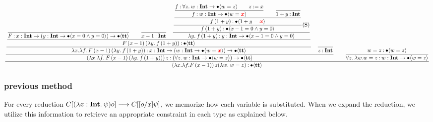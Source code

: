 \documentclass{article}
\begin{document}
\small
\begin{equation*}
    \dfrac{
    \dfrac{
        \dfrac{
            \dfrac{
                    \dfrac{
                    }{
                    F \mathbin{:} {x} : \textbf{Int} \to ({y} : \textbf{Int} \to \bullet \langle x = 0 \wedge y = 0 \rangle) \to \bullet \langle \textbf{tt} \rangle
                    }
                    \qquad
                    \dfrac{}{
                    x - 1 \mathbin{:} \textbf{Int}
                    }
                \quad
                \dfrac{
                    \dfrac{
                        \dfrac{
                            \dfrac{f \mathbin{:} \forall z.\: {w} : \textbf{Int} \to \bullet \langle w = z \rangle\qquad z := x}{
                                f \mathbin{:} {w} : \textbf{Int} \to \bullet \langle w=\textcolor{red}{\boldsymbol x} \rangle
                            }
                            \qquad
                            \dfrac{}{
                                1+y \mathbin{:} \textbf{Int}
                            }
                        }{
                            f\,(1+y) \mathbin{:} \bullet \langle 1+y=\textcolor{red}{\boldsymbol x} \rangle
                        }
                    } {
                        f\,(1+y) \mathbin{:} \bullet \langle x - 1 = 0 \wedge y = 0 \rangle
                    }\text{(S)}
                } {
                    \lambda y.\: f\,(1+y) \mathbin{:} {y} : \textbf{Int} \to \bullet \langle x - 1 = 0 \wedge y = 0 \rangle
                }
            }{
                F\, (x-1)\, (\lambda y.\: f\,(1+y))  \mathbin{:} \bullet \langle \textbf{tt} \rangle
            }
        }{
            \lambda x. \lambda f.\: F\, (x-1)\, (\lambda y.\: f\,(1+y)) \mathbin{:} {x} : \textbf{Int} \to ({w} : \textbf{Int} \to \bullet \langle w = \textcolor{red}{\boldsymbol x} \rangle) \to \bullet \langle \textbf{tt} \rangle
        }
        \quad
        \dfrac{}{
        z \mathbin{:} \textbf{Int}
        }
        }{
            (\lambda x. \lambda f.\: F\, (x-1)\, (\lambda y.\: f\,(1+y)))\, z \mathbin{:} (\forall z.\: {w} : \textbf{Int} \to \bullet \langle w = z \rangle) \to \bullet \langle \textbf{tt} \rangle
        }
        \qquad 
        \dfrac{
            w = z \mathbin{:} \bullet \langle  w = z \rangle
        }{
            \forall z.\: \lambda w. w = z \mathbin{:} {w} : \textbf{Int} \to \bullet \langle w = z \rangle
        }
    }{
        (\lambda x. \lambda f. F\, (x-1))\, z (\lambda w.\: w = z) \mathbin{:} \bullet \langle \textbf{tt} \rangle
    }
\end{equation*}

\subsubsection{previous method}


For every reduction \( C[(\lambda x:\textbf{Int}.\: \psi) o] \longrightarrow C[[o/x]\psi] \), we memorize how each variable is substituted. 
When we expand the reduction, we utilize this information to retrieve an appropriate constraint in each type as explained below.
\end{document}
